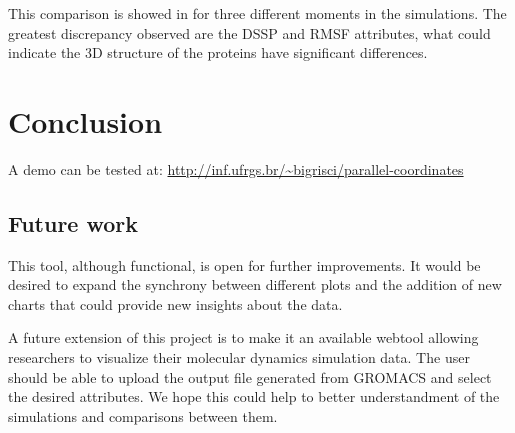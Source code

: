 \documentclass[10pt, conference]{IEEEtran}
\begin{document}
This comparison is showed in  for three different moments in the simulations. The greatest discrepancy observed are the DSSP and RMSF attributes, what could indicate the 3D structure of the proteins have significant differences.





\section{Conclusion}
%
A demo can be tested at: \url{http://inf.ufrgs.br/~bigrisci/parallel-coordinates}

\subsection{Future work}
%
This tool, although functional, is open for further improvements. It would be desired to expand the synchrony between different plots and the addition of new charts that could provide new insights about the data.

A future extension of this project is to make it an available webtool allowing researchers to visualize their molecular dynamics simulation data. The user should be able to upload the output file generated from GROMACS and select the desired attributes. We hope this could help to better understandment of the simulations and comparisons between them.
\end{document}
